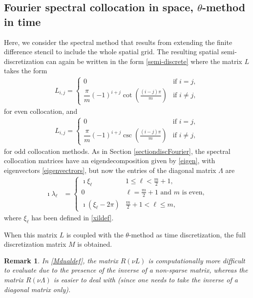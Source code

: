 \documentclass[a4paper]{article}
\newtheorem{remark}{Remark}
\begin{document}
\subsection{Fourier spectral collocation in space, $\theta$-method in time}\label{spectrcoll}
Here, we consider the spectral method that results from extending the
finite difference stencil to include the whole spatial grid.  The resulting spatial 
semi-discretization can again be written in the form \eqref{semi-discrete}
where the matrix $L$ takes the form \cite{trefethen,peyret}
\begin{align*}
	L_{i,j} = \begin{cases}
						0 & \text{if } i = j, \\[10pt]
						\dfrac{\pi}{m}(-1)^{i+j}\cot{\!\left(\frac{(i-j)\pi}{m}\right)} & \text{if } i \neq j,
					\end{cases}
\end{align*}
for even collocation, and
\begin{align*}
	L_{i,j} = \begin{cases}
						0 & \text{if } i = j, \\[10pt]
						\dfrac{\pi}{m}(-1)^{i+j}\csc{\!\left(\frac{(i-j)\pi}{m}\right)} & \text{if } i \neq j,
					\end{cases}
\end{align*}
for odd collocation methods.
As in Section \ref{sectiondiscFourier}, the spectral collocation matrices have an eigendecomposition given by
\eqref{eigen}, with eigenvectors \eqref{eigenvectrors}, but now the entries of the diagonal matrix $\Lambda$ are
\begin{align}
    \imath\lambda_\ell & =
    \begin{cases}
        \imath\xi_\ell & 1 \le \ell < \frac{m}{2}+1, \\
        0 & \ell = \frac{m}{2}+1 \text{ and } m \text{ is even}, \\
        \imath(\xi_\ell - 2\pi) & \frac{m}{2}+1 < \ell \le m,
    \end{cases}
\end{align}
where $\xi_\ell$ has been defined in \eqref{xildef}.

When this matrix $L$ is coupled with the $\theta$-method as time discretization, the full discretization matrix $M$ is obtained. 
\begin{remark} 
In \eqref{Mdualdef}, the matrix $R(\nu L)$ is computationally more difficult to evaluate due to the presence of the inverse of a non-sparse matrix, whereas the matrix $R(\nu \Lambda)$ is easier to deal with (since one needs to take the inverse of a diagonal matrix only).
\end{remark} 
\end{document}
